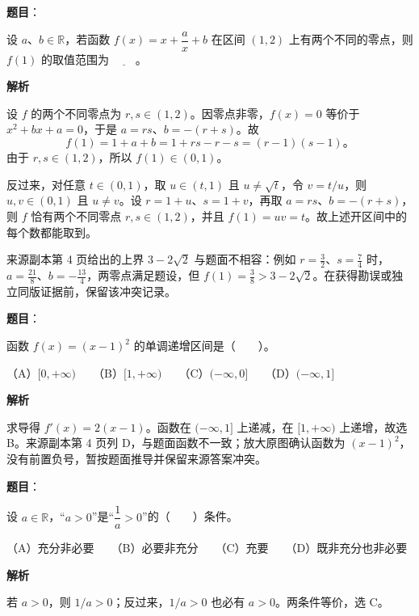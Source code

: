 \begin{answer}

\textbf{题目}：

设 $a\text{、}b\in\mathbb R$，若函数 $f(x)=x+\dfrac ax+b$ 在区间 $(1,2)$ 上有两个不同的零点，则 $f(1)$ 的取值范围为 $\underline{\qquad}$。

\textbf{解析}

设 $f$ 的两个不同零点为 $r,s\in(1,2)$。因零点非零，$f(x)=0$ 等价于 $x^2+bx+a=0$，于是 $a=rs$、$b=-(r+s)$。故
\nopagebreak[4]
\[
f(1)=1+a+b=1+rs-r-s=(r-1)(s-1)\mbox{。}
\]
由于 $r,s\in(1,2)$，所以 $f(1)\in(0,1)$。

反过来，对任意 $t\in(0,1)$，取 $u\in(t,1)$ 且 $u\ne\sqrt t$，令 $v=t/u$，则 $u,v\in(0,1)$ 且 $u\ne v$。设 $r=1+u$、$s=1+v$，再取 $a=rs$、$b=-(r+s)$，则 $f$ 恰有两个不同零点 $r,s\in(1,2)$，并且 $f(1)=uv=t$。故上述开区间中的每个数都能取到。

来源副本第 4 页给出的上界 $3-2\sqrt2$ 与题面不相容：例如 $r=\frac32$、$s=\frac74$ 时，$a=\frac{21}8$、$b=-\frac{13}4$，两零点满足题设，但 $f(1)=\frac38>3-2\sqrt2$。在获得勘误或独立同版证据前，保留该冲突记录。


\end{answer}
\begin{answer}

\textbf{题目}：

函数 $f(x)=(x-1)^2$ 的单调递增区间是\mbox{（　　）}。

（A）$[0,+\infty)$　　（B）$[1,+\infty)$　　（C）$(-\infty,0]$　　（D）$(-\infty,1]$

\textbf{解析}

求导得 $f'(x)=2(x-1)$。函数在 $(-\infty,1]$ 上递减，在 $[1,+\infty)$ 上递增，故选 B。来源副本第 4 页列 D，与题面函数不一致；放大原图确认函数为 $(x-1)^2$，没有前置负号，暂按题面推导并保留来源答案冲突。


\end{answer}
\begin{answer}

\textbf{题目}：

设 $a\in\mathbb R$，“$a>0$”是“$\dfrac1a>0$”的\mbox{（　　）}条件。

（A）充分非必要　　（B）必要非充分　　（C）充要　　（D）既非充分也非必要

\textbf{解析}

若 $a>0$，则 $1/a>0$；反过来，$1/a>0$ 也必有 $a>0$。两条件等价，选 C。


\end{answer}

